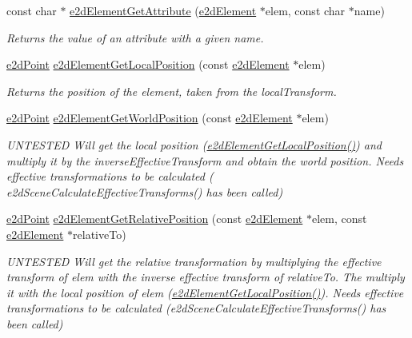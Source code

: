 \begin{DoxyCompactItemize}
const char $\ast$ \hyperlink{group__e2d_element_gac32ea8a33b317fc014929102d64ac157}{e2d\-Element\-Get\-Attribute} (\hyperlink{structe2d_element}{e2d\-Element} $\ast$elem, const char $\ast$name)
\begin{DoxyCompactList}\small\item\em Returns the value of an attribute with a given name. \end{DoxyCompactList}\item 
\hyperlink{structe2d_point}{e2d\-Point} \hyperlink{group__e2d_element_ga39dd883e42f609efba3f75300a29ff31}{e2d\-Element\-Get\-Local\-Position} (const \hyperlink{structe2d_element}{e2d\-Element} $\ast$elem)
\begin{DoxyCompactList}\small\item\em Returns the position of the element, taken from the local\-Transform. \end{DoxyCompactList}\item 
\hyperlink{structe2d_point}{e2d\-Point} \hyperlink{group__e2d_element_ga9b85de42e52c0d89e82f9231ea923c8c}{e2d\-Element\-Get\-World\-Position} (const \hyperlink{structe2d_element}{e2d\-Element} $\ast$elem)
\begin{DoxyCompactList}\small\item\em U\-N\-T\-E\-S\-T\-E\-D Will get the local position (\hyperlink{group__e2d_element_ga39dd883e42f609efba3f75300a29ff31}{e2d\-Element\-Get\-Local\-Position()}) and multiply it by the inverse\-Effective\-Transform and obtain the world position. Needs effective transformations to be calculated ( e2d\-Scene\-Calculate\-Effective\-Transforms() has been called) \end{DoxyCompactList}\item 
\hyperlink{structe2d_point}{e2d\-Point} \hyperlink{group__e2d_element_gab4e3f4eeba31c937a946f68617c5cb06}{e2d\-Element\-Get\-Relative\-Position} (const \hyperlink{structe2d_element}{e2d\-Element} $\ast$elem, const \hyperlink{structe2d_element}{e2d\-Element} $\ast$relative\-To)
\begin{DoxyCompactList}\small\item\em U\-N\-T\-E\-S\-T\-E\-D Will get the relative transformation by multiplying the effective transform of elem with the inverse effective transform of relative\-To. The multiply it with the local position of elem (\hyperlink{group__e2d_element_ga39dd883e42f609efba3f75300a29ff31}{e2d\-Element\-Get\-Local\-Position()}). Needs effective transformations to be calculated (e2d\-Scene\-Calculate\-Effective\-Transforms() has been called) \end{DoxyCompactList}\item 

\end{DoxyCompactItemize}
